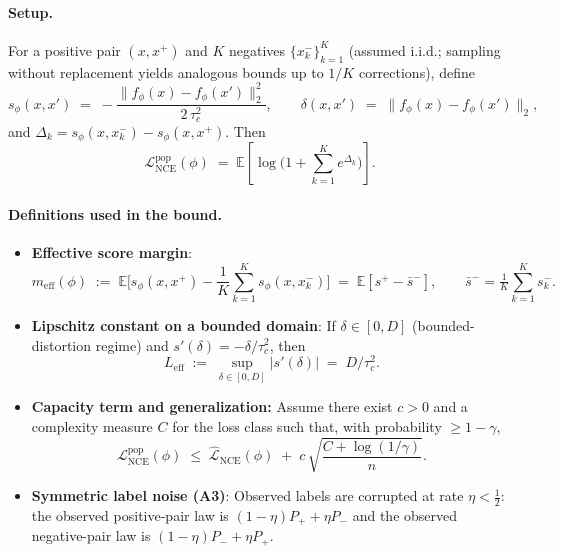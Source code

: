 \documentclass[11pt]{article}
\begin{document}
\paragraph{Setup.}
For a positive pair $(x,x^+)$ and $K$ negatives $\{x_k^-\}_{k=1}^K$ (assumed i.i.d.; sampling without replacement yields analogous bounds up to $1/K$ corrections), define
\[
s_\phi(x,x') \;=\; -\frac{\|f_\phi(x)-f_\phi(x')\|_2^2}{2\,\tau_c^2},\qquad
\delta(x,x') \;=\; \|f_\phi(x)-f_\phi(x')\|_2,
\]
and $\Delta_k \!=\! s_\phi(x,x_k^-) - s_\phi(x,x^+)$.
Then
\[
\mathcal{L}_{\mathrm{NCE}}^{\mathrm{pop}}(\phi)
\;=\;
\mathbb{E}\!
\left[
\log\!\Big(1 + \sum_{k=1}^{K} e^{\Delta_k}\Big)
\right].
\]

\paragraph{Definitions used in the bound.}
\begin{itemize}[leftmargin=*, itemsep=2pt, topsep=2pt]
\item \textbf{Effective score margin}:
\[
m_{\mathrm{eff}}(\phi)
\;:=\;
\mathbb{E}\Big[s_\phi(x,x^+) - \frac{1}{K}\sum_{k=1}^{K} s_\phi(x,x_k^-)\Big]
\;=\; \mathbb{E}[s^+ - \bar{s}^-],\qquad \bar{s}^-=\tfrac{1}{K}\sum_{k=1}^{K} s_k^- .
\]
\item \textbf{Lipschitz constant on a bounded domain}:
If $\delta\in[0,D]$ (bounded-distortion regime) and $s'(\delta)=-\delta/\tau_c^2$, then
\[
L_{\mathrm{eff}} \;:=\; \sup_{\delta\in[0,D]}|s'(\delta)| \;=\; D/\tau_c^2.
\]
\item \textbf{Capacity term and generalization:}
Assume there exist $c>0$ and a complexity measure $C$ for the loss class such that, with probability $\ge 1-\gamma$,
\[
\mathcal{L}_{\mathrm{NCE}}^{\mathrm{pop}}(\phi)
\;\le\;
\widehat{\mathcal{L}}_{\mathrm{NCE}}(\phi)
\;+\; c\,\sqrt{\frac{C+\log(1/\gamma)}{n}}.
\]
\item \textbf{Symmetric label noise (A3)}:
Observed labels are corrupted at rate $\eta<\tfrac12$: the observed positive-pair law is $(1-\eta)P_+ + \eta P_-$ and the observed negative-pair law is $(1-\eta)P_- + \eta P_+$.
\end{itemize}
\end{document}
